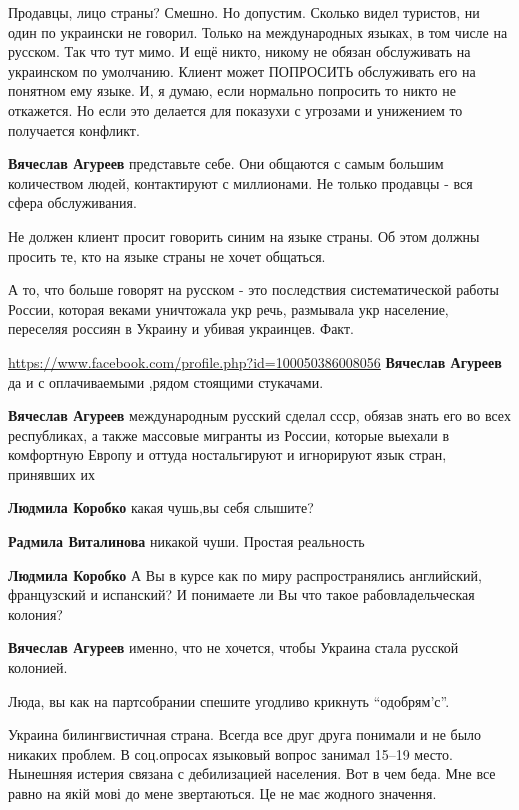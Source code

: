 \begin{itemize}
\begin{itemize}

Продавцы, лицо страны? Смешно. Но допустим. Сколько видел туристов, ни один по
украински не говорил. Только на международных языках, в том числе на русском.
Так что тут мимо. И ещё никто, никому не обязан обслуживать на украинском по
умолчанию. Клиент может ПОПРОСИТЬ обслуживать его на понятном ему языке. И, я
думаю, если нормально попросить то никто не откажется. Но если это делается для
показухи с угрозами и унижением то получается конфликт.

\textbf{Вячеслав Агуреев} представьте себе. Они общаются с самым большим
количеством людей, контактируют с миллионами. Не только продавцы - вся сфера
обслуживания.

Не должен клиент просит говорить синим на языке страны. Об этом должны просить
те, кто на языке страны не хочет общаться.

А то, что больше говорят на русском - это последствия систематической работы
России, которая веками уничтожала укр речь, размывала укр население, переселяя
россиян в Украину и убивая украинцев. Факт.


\url{https://www.facebook.com/profile.php?id=100050386008056}
\textbf{Вячеслав Агуреев} да и с оплачиваемыми ,рядом стоящими стукачами.

\textbf{Вячеслав Агуреев} международным русский сделал ссср, обязав знать его во всех республиках, а также массовые мигранты из России, которые выехали в комфортную Европу и оттуда ностальгируют и игнорируют язык стран, принявших их

\textbf{Людмила Коробко} какая чушь,вы себя слышите?

\textbf{Радмила Виталинова} никакой чуши. Простая реальность

\textbf{Людмила Коробко} А Вы в курсе как по миру распространялись английский, французский и испанский? И понимаете ли Вы что такое рабовладельческая колония?

\textbf{Вячеслав Агуреев} именно, что не хочется, чтобы Украина стала русской колонией.


Люда, вы как на партсобрании спешите угодливо крикнуть \enquote{одобрям'с}.

Украина билингвистичная страна. Всегда все друг друга понимали и не было
никаких проблем. В соц.опросах языковый вопрос занимал 15--19 место. Нынешняя
истерия связана с дебилизацией населения. Вот в чем беда. Мне все равно на якій
мові до мене звертаються. Це не має жодного значення.


\end{itemize}
\end{itemize}
